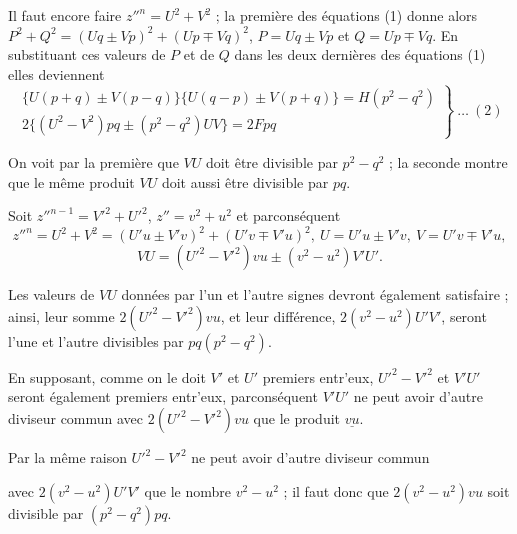 \documentclass[11pt,a4paper]{article}
\begin{document}
Il faut encore faire $z''^n=U^2+V^2$ ; la première des équations (1)
donne alors $P^2+Q^2=(Uq\pm Vp)^2+(Up\mp Vq)^2$, $P=Uq\pm Vp$ et $Q=Up\mp Vq$. En
substituant ces valeurs de $P$ et de $Q$ dans les deux dernières des
équations (1) elles deviennent
\[\left.\begin{array}{r}
\{U(p+q)\pm V(p-q)\}\{U(q-p)\pm V(p+q)\}=H(p^2-q^2)\\
2\{(U^2-V^2)pq\pm(p^2-q^2)UV\}=2Fpq
\end{array}\right\}\ \ldots\ (2)\]

On voit par la première que $VU$ doit être divisible par $p^2-q^2$ ; la
seconde montre que le même produit $VU$ doit aussi être divisible par $pq$.

Soit $z''^{n-1}=V'^2+U'^2$, $z''=v^2+u^2$ et parconséquent
\[z''^n=U^2+V^2=(U'u\pm V'v)^2+(U'v\mp V'u)^2,\ U=U'u\pm V'v,\ V=U'v\mp V'u,\]
\[VU=(U'^2-V'^2)vu\pm(v^2-u^2)V'U'.\]

Les valeurs de $VU$ données par l'un et l'autre signes devront également
satisfaire ; ainsi, leur somme $2(U'^2-V'^2)vu$, et leur différence, $2(v^2-u^2)U'V'$,
seront l'une et l'autre divisibles par $pq(p^2-q^2)$.

En supposant, comme on le doit $V'$ et $U'$ premiers entr'eux, $U'^2-V'^2$
et $V'U'$ seront également premiers entr'eux, parconséquent $V'U'$ ne peut
avoir d'autre diviseur commun avec $2(U'^2-V'^2)vu$ que le produit $\underline{vu}$.

Par la même raison $U'^2-V'^2$ ne peut avoir d'autre diviseur commun



avec $2(v^2-u^2)U'V'$ que le nombre $v^2-u^2$ ; il faut donc que $2(v^2-u^2)vu$ soit
divisible par $(p^2-q^2)pq$.
\end{document}

